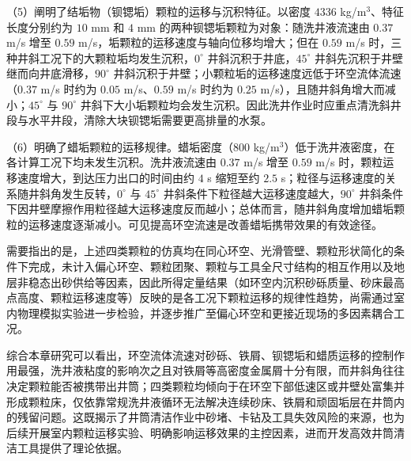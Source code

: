 （5）阐明了结垢物（钡锶垢）颗粒的运移与沉积特征。以密度 $4336$ kg/m$^{3}$、特征长度分别约为 $10$ mm 和 $4$ mm 的两种钡锶垢颗粒为对象：随洗井液流速由 $0.37$ m/s 增至 $0.59$ m/s，垢颗粒的运移速度与轴向位移均增大；但在 $0.59$ m/s 时，三种井斜工况下的大颗粒垢均发生沉积，$0^\circ$ 井斜沉积于井底，$45^\circ$ 井斜先沉积于井壁继而向井底滑移，$90^\circ$ 井斜沉积于井壁；小颗粒垢的运移速度远低于环空流体流速（$0.37$ m/s 时约为 $0.05$ m/s、$0.59$ m/s 时约为 $0.25$ m/s），且随井斜角增大而减小；$45^\circ$ 与 $90^\circ$ 井斜下大小垢颗粒均会发生沉积。因此洗井作业时应重点清洗斜井段与水平井段，清除大块钡锶垢需要更高排量的水泵。

（6）明确了蜡垢颗粒的运移规律。蜡垢密度（$800$ kg/m$^{3}$）低于洗井液密度，在各计算工况下均未发生沉积。洗井液流速由 $0.37$ m/s 增至 $0.59$ m/s 时，颗粒运移速度增大，到达压力出口的时间由约 $4$ s 缩短至约 $2.5$ s；粒径与运移速度的关系随井斜角发生反转，$0^\circ$ 与 $45^\circ$ 井斜条件下粒径越大运移速度越大，$90^\circ$ 井斜条件下因井壁摩擦作用粒径越大运移速度反而越小；总体而言，随井斜角度增加蜡垢颗粒的运移速度逐渐减小。可见提高环空流速是改善蜡垢携带效果的有效途径。

需要指出的是，上述四类颗粒的仿真均在同心环空、光滑管壁、颗粒形状简化的条件下完成，未计入偏心环空、颗粒团聚、颗粒与工具全尺寸结构的相互作用以及地层非稳态出砂供给等因素，因此所得定量结果（如环空内沉积砂砾质量、砂床最高点高度、颗粒运移速度等）反映的是各工况下颗粒运移的规律性趋势，尚需通过室内物理模拟实验进一步检验，并逐步推广至偏心环空和更接近现场的多因素耦合工况。

综合本章研究可以看出，环空流体流速对砂砾、铁屑、钡锶垢和蜡质运移的控制作用最强，洗井液粘度的影响次之且对铁屑等高密度金属屑十分有限，而井斜角往往决定颗粒能否被携带出井筒；四类颗粒均倾向于在环空下部低速区或井壁处富集并形成颗粒床，仅依靠常规洗井液循环无法解决连续砂床、铁屑和顽固垢层在井筒内的残留问题。这既揭示了井筒清洁作业中砂堵、卡钻及工具失效风险的来源，也为后续开展室内颗粒运移实验、明确影响运移效果的主控因素，进而开发高效井筒清洁工具提供了理论依据。
